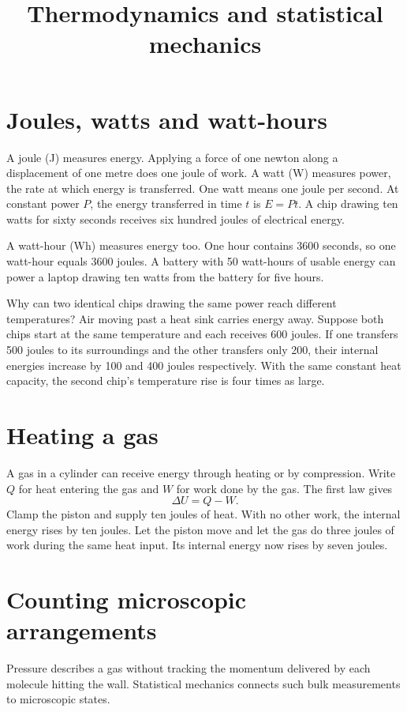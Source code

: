 



\title{
Thermodynamics and statistical mechanics}
\maketitle

\tableofcontents

\section{Joules, watts and watt-hours}

A joule (J) measures energy. Applying a
force of one newton along a displacement of
one metre does one joule of work. A watt
(W) measures power, the rate at which
energy is transferred. One watt means one
joule per second. At constant power $P$,
the energy transferred in time $t$ is
$
E=Pt.
$
A chip drawing ten watts for sixty seconds
receives six hundred joules of electrical
energy.

A watt-hour (Wh) measures energy too.
One hour contains 3600 seconds, so one
watt-hour equals 3600 joules. A battery
with 50 watt-hours of usable energy can
power a laptop drawing ten watts from the
battery for five hours.

Why can two identical chips drawing the
same power reach different temperatures?
Air moving past a heat sink carries energy
away. Suppose both chips start at the same
temperature and each receives 600 joules.
If one transfers 500 joules to its
surroundings and the other transfers only
200, their internal energies increase by
100 and 400 joules respectively. With the
same constant heat capacity, the second
chip's temperature rise is four times as
large.

\section{Heating a gas}
A gas in a cylinder can receive energy
through heating or by compression. Write $Q$
for heat entering the gas and $W$ for work
done by the gas. The first law gives
$$
\Delta U=Q-W.
$$
Clamp the piston and supply ten joules of
heat. With no other work, the internal energy
rises by ten joules. Let the piston move and
let the gas do three joules of work during
the same heat input. Its internal energy now
rises by seven joules.

\section{Counting microscopic arrangements}
Pressure describes a gas without tracking the
momentum delivered by each molecule hitting
the wall. Statistical mechanics connects such
bulk measurements to microscopic states.

